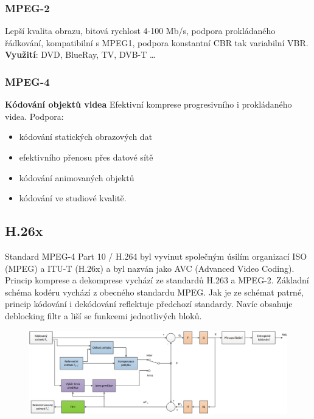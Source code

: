 \subsubsection{MPEG-2}
Lepší kvalita obrazu, bitová rychlost 4-100 Mb/s, podpora prokládaného řádkování, kompatibilní s MPEG1, podpora konstantní CBR tak variabilní VBR. \textbf{Využití}: DVD, BlueRay, TV, DVB-T …

\subsubsection{MPEG-4}
\textbf{Kódování objektů videa}
Efektivní komprese progresivního i prokládaného videa.
Podpora: \vspace{-4mm}
\begin{itemize}
    \item kódování statických obrazových dat
    \item efektivního přenosu přes datové sítě 
    \item kódování animovaných objektů 
    \item kódování ve studiové kvalitě.
\end{itemize}

\subsection{H.26x}

Standard MPEG-4 Part 10 / H.264 byl vyvinut společným úsilím organizací ISO (MPEG)
a ITU-T (H.26x) a byl nazván jako AVC (Advanced Video Coding). Princip komprese a
dekomprese vychází ze standardů H.263 a MPEG-2. Základní schéma kodéru vychází z obecného standardu MPEG. Jak je ze schémat patrné, princip kódování i dekódování reflektuje předchozí standardy. Navíc obsahuje deblocking filtr a liší se funkcemi jednotlivých bloků.

\begin{figure}[ht]
    \centering
    \includegraphics[width=1\linewidth]{MPC-ZMD//images/h264.png}
\end{figure}
\FloatBarrier

